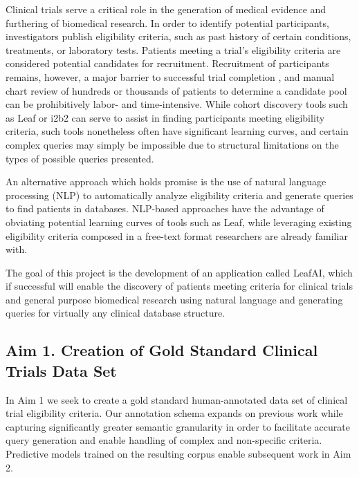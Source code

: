 \documentclass[../main.tex]{subfiles}
\begin{document}
\noindent Clinical trials serve a critical role in the generation of medical evidence and furthering of biomedical research. In order to identify potential participants, investigators publish eligibility criteria, such as past history of certain conditions, treatments, or laboratory tests. Patients meeting a trial's eligibility criteria are considered potential candidates for recruitment. Recruitment of participants remains, however, a major barrier to successful trial completion \cite{richesson2013electronic}, and manual chart review of hundreds or thousands of patients to determine a candidate pool can be prohibitively labor- and time-intensive. While cohort discovery tools such as Leaf \cite{dobbins2019leaf} or i2b2 \cite{murphy2010serving} can serve to assist in finding participants meeting eligibility criteria, such tools nonetheless often have significant learning curves, and certain complex queries may simply be impossible due to structural limitations on the types of possible queries presented.

An alternative approach which holds promise is the use of natural language processing (NLP) to automatically analyze eligibility criteria and generate queries to find patients in databases. NLP-based approaches have the advantage of obviating potential learning curves of tools such as Leaf, while leveraging existing eligibility criteria composed in a free-text format researchers are already familiar with.

The goal of this project is the development of an application called LeafAI, which if successful will enable the discovery of patients meeting criteria for clinical trials and general purpose biomedical research using natural language and generating queries for virtually any clinical database structure.

\subsection{Aim 1. Creation of Gold Standard Clinical Trials Data Set}
In Aim 1 we seek to create a gold standard human-annotated data set of clinical trial eligibility criteria. Our annotation schema expands on previous work \cite{kury2020chia, kang2017eliie} while capturing significantly greater semantic granularity in order to facilitate accurate query generation and enable handling of complex and non-specific criteria. Predictive models trained on the resulting corpus enable subsequent work in Aim 2.
\end{document}
